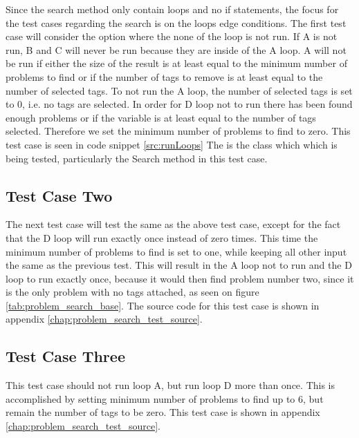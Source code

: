 Since the search method only contain loops and no if statements, the focus for the test cases regarding the search is on the loops edge conditions.
The first test case will consider the option where the none of the loop is not run.
If A is not run, B and C will never be run because they are inside of the A loop.
A will not be run if either the size of the result is at least equal to the minimum number of problems to find or if the number of tags to remove is at least equal to the number of selected tags.
To not run the A loop, the number of selected tags is set to 0, i.e. no tags are selected.
In order for D loop not to run there has been found enough problems or if the  variable is at least equal to the number of tags selected. Therefore we set the minimum number of problems to find to zero.
This test case is seen in code snippet \ref{src:runLoops}
The  is the class which which is being tested, particularly the Search method in this test case.

\subsection{Test Case Two}
The next test case will test the same as the above test case, except for the fact that the D loop will run exactly once instead of zero times.
This time the minimum number of problems to find is set to one, while keeping all other input the same as the previous test.
This will result in the A loop not to run and the D loop to run exactly once, because it would then find problem number two, since it is the only problem with no tags attached, as seen on figure \ref{tab:problem_search_base}.
The source code for this test case is shown in appendix \ref{chap:problem_search_test_source}.

\subsection{Test Case Three}
This test case should not run loop A, but run loop D more than once.
This is accomplished by setting minimum number of problems to find up to 6, but remain the number of tags to be zero.
This test case is shown in appendix \ref{chap:problem_search_test_source}.

